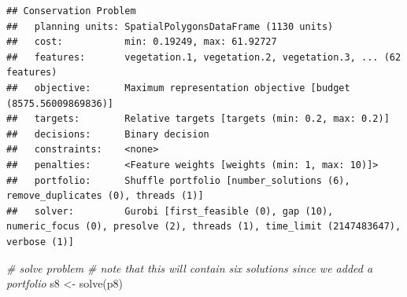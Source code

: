 \documentclass[
  12pt,
]{book}
\newenvironment{Shaded}{\begin{snugshade}}{\end{snugshade}}
\newcommand{\CommentTok}[1]{\textcolor[rgb]{0.56,0.35,0.01}{\textit{#1}}}
\newcommand{\FunctionTok}[1]{\textcolor[rgb]{0.00,0.00,0.00}{#1}}
\newcommand{\NormalTok}[1]{#1}
\newcommand{\OtherTok}[1]{\textcolor[rgb]{0.56,0.35,0.01}{#1}}
\begin{document}
\begin{verbatim}
## Conservation Problem
##   planning units: SpatialPolygonsDataFrame (1130 units)
##   cost:           min: 0.19249, max: 61.92727
##   features:       vegetation.1, vegetation.2, vegetation.3, ... (62 features)
##   objective:      Maximum representation objective [budget (8575.56009869836)]
##   targets:        Relative targets [targets (min: 0.2, max: 0.2)]
##   decisions:      Binary decision 
##   constraints:    <none>
##   penalties:      <Feature weights [weights (min: 1, max: 10)]>
##   portfolio:      Shuffle portfolio [number_solutions (6), remove_duplicates (0), threads (1)]
##   solver:         Gurobi [first_feasible (0), gap (10), numeric_focus (0), presolve (2), threads (1), time_limit (2147483647), verbose (1)]
\end{verbatim}

\begin{Shaded}
\begin{Highlighting}[]
\CommentTok{\# solve problem}
\CommentTok{\# note that this will contain six solutions since we added a portfolio}
\NormalTok{s8 }\OtherTok{\textless{}{-}} \FunctionTok{solve}\NormalTok{(p8)}
\end{Highlighting}
\end{Shaded}
\end{document}
